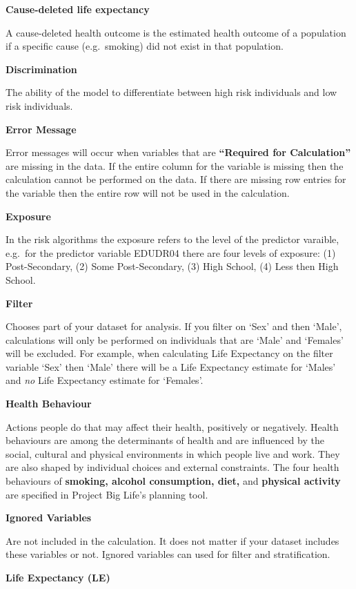 \documentclass[]{book}
\begin{document}
\textbf{Cause-deleted life expectancy}

A cause-deleted health outcome is the estimated
health outcome of a population if a specific cause (e.g.~smoking) did
not exist in that population.

\textbf{Discrimination}

The ability of the model to differentiate between high risk individuals
and low risk individuals.

\textbf{Error Message}

Error messages will occur when variables that are \textbf{``Required for
Calculation''} are missing in the data. If the entire column for the
variable is missing then the calculation cannot be performed on the
data. If there are missing row entries for the variable then the entire
row will not be used in the calculation.

\textbf{Exposure}

In the risk algorithms the exposure refers to the level of the predictor
varaible, e.g.~for the predictor variable EDUDR04 there are four levels
of exposure: (1) Post-Secondary, (2) Some Post-Secondary, (3) High
School, (4) Less then High School.

\textbf{Filter}

Chooses part of your dataset for analysis. If you filter on
`Sex' and then `Male', calculations will only be performed on
individuals that are `Male' and `Females' will be excluded. For example,
when calculating Life Expectancy on the filter variable `Sex' then
`Male' there will be a Life Expectancy estimate for `Males' and
\emph{no} Life Expectancy estimate for `Females'.

\textbf{Health Behaviour}

Actions people do that may affect their health, positively or
negatively. Health behaviours are among the determinants of health and
are influenced by the social, cultural and physical environments in
which people live and work.\citep{StatsCan2010} They are also shaped by
individual choices and external constraints.\citep{StatsCan2010} The
four health behaviours of \textbf{smoking, alcohol consumption, diet,}
and \textbf{physical activity} are specified in Project Big Life's
planning tool.

\textbf{Ignored Variables}

Are not included in the calculation. It does not matter if your dataset
includes these variables or not. Ignored variables can used for filter
and stratification.

\textbf{Life Expectancy (LE)}
\end{document}
